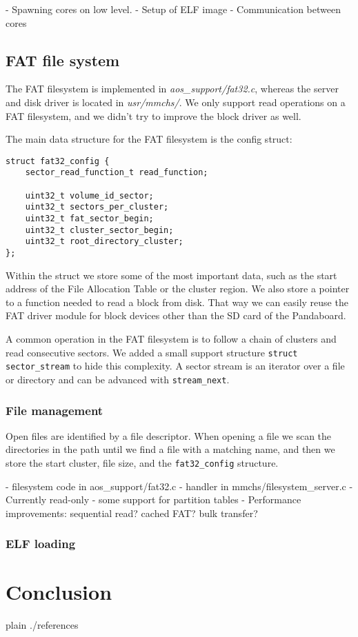 \documentclass[a4paper,10pt]{article}
\newcommand{\filepath}[1]{\emph{ #1}}
\begin{document}
\todo {}

- Spawning cores on low level.
- Setup of ELF image
- Communication between cores

\subsection{FAT file system}

The FAT filesystem is implemented in \filepath{aos\_support/fat32.c}, whereas the server and disk driver is located in \filepath{usr/mmchs/}.
We only support read operations on a FAT filesystem, and we didn't try to improve the block driver as well.

The main data structure for the FAT filesystem is the config struct:

\begin{lstlisting}
struct fat32_config {
    sector_read_function_t read_function;

    uint32_t volume_id_sector;
    uint32_t sectors_per_cluster;
    uint32_t fat_sector_begin;
    uint32_t cluster_sector_begin;
    uint32_t root_directory_cluster;
};
\end{lstlisting}

Within the struct we store some of the most important data, such as the start address of the File Allocation Table or the cluster region.
We also store a pointer to a function needed to read a block from disk.
That way we can easily reuse the FAT driver module for block devices other than the SD card of the Pandaboard.

A common operation in the FAT filesystem is to follow a chain of clusters and read consecutive sectors.
We added a small support structure \lstinline!struct sector_stream! to hide this complexity.
A sector stream is an iterator over a file or directory and can be advanced with \lstinline!stream_next!.

\subsubsection{File management}

Open files are identified by a file descriptor.
When opening a file we scan the directories in the path until we find a file with a matching name, and then we store the start cluster, file size, and the \lstinline!fat32_config! structure.






- filesystem code in aos\_support/fat32.c
- handler in mmchs/filesystem\_server.c
- Currently read-only
- some support for partition tables
- Performance improvements: sequential read? cached FAT? bulk transfer?

\subsubsection{ ELF loading}


\section{Conclusion}

\begin{flushleft}
{{{
 {plain}
 {./references}
}}}
\end{flushleft}


\todos
\end{document}
